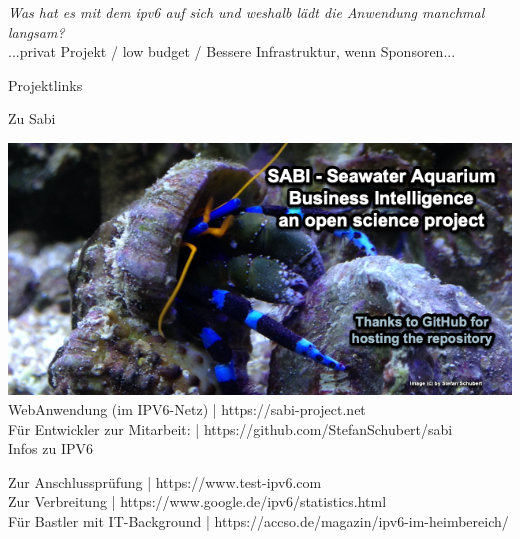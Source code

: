 \documentclass[12pt,a4paper,oneside,twocolumn]{article}
\begin{document}
\begin{flushleft}
{\it Was hat es mit dem ipv6 auf sich und weshalb lädt die Anwendung manchmal langsam? } \\

...privat Projekt / low budget / Bessere Infrastruktur, wenn Sponsoren...

\textcolor{sabiblue}{\Large{Projektlinks}}
\vspace*{0.8cm}

\textcolor{sabiblue}{\normalsize{Zu Sabi}}\\
\vspace*{0.5cm}

{\includegraphics[scale=0.4]{RepositoryPreview.png}}\\
\vspace*{0.5cm}
WebAnwendung (im IPV6-Netz) | https://sabi-project.net\\
Für Entwickler zur Mitarbeit: | https://github.com/StefanSchubert/sabi\\

\vspace*{0.5cm}
\textcolor{sabiblue}{\normalsize{Infos zu IPV6}}\\
\vspace*{0.5cm}

Zur Anschlussprüfung | https://www.test-ipv6.com\\
Zur Verbreitung | https://www.google.de/ipv6/statistics.html\\
Für Bastler mit IT-Background | https://accso.de/magazin/ipv6-im-heimbereich/

\end{flushleft}
\end{document}
